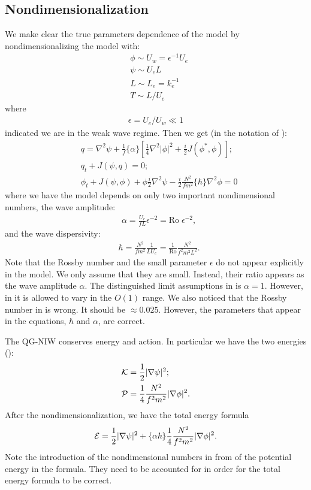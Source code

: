 \subsection{Nondimensionalization}
We make clear the true parameters dependence of the model by nondimensionalizing the model with:
\begin{align}
    &\phi \sim U_w = \epsilon^{-1} U_e\\
    &\psi \sim U_e L\\
    &L \sim L_e = k_e^{-1}\\
    &T \sim L/U_e
\end{align}
where
\begin{align}
    \epsilon = {U_e}/{U_w}\ll 1
\end{align}
indicated we are in the weak wave regime. Then we get (in the notation of \cite{Vallis_96a}):
\begin{align}
    &q = \nabla^2\psi + \frac{1}{f}\{\alpha\}\left[\frac{1}{4}\nabla^2|\phi|^2+\frac{i}{2}J(\phi^*,\phi)\right];\\
    &q_t + J(\psi,q) = 0;\\
    &\phi_t+J(\psi,\phi)+\phi\frac{i}{2}\nabla^2\psi-\frac{i}{2} \frac{N^2}{f m^2} \{\hbar\}\nabla^2\phi = 0\label{eq:QGNIW_eq3}
\end{align}
where we have the model depends on only two important nondimensional numbers, the wave amplitude:
\begin{align}
    &\alpha = \frac{U_e}{fL}\epsilon^{-2} = \text{Ro}\;\epsilon^{-2},
\end{align}
and the wave dispersivity:
\begin{align}
    &\hbar = \frac{N^2}{fm^2}\frac{1}{LU_e} = \frac{1}{\text{Ro}}\frac{N^2}{f^2 m^2 L^2}.
\end{align}
Note that the Rossby number and the small parameter $\epsilon$ do not appear explicitly in the model. We only assume that they are small. Instead, their ratio appears as the wave amplitude $\alpha$. The distinguished limit assumptions in \cite{XieVanneste_15, WagnerYoung_15, WagnerYoung_16} is $\alpha = 1$. However, in \cite{RochaEtAl_18} it is allowed to vary in the $O(1)$ range. We also noticed that the Rossby number in \cite[Table 4]{RochaEtAl_18} is wrong. It should be $\approx 0.025$. However, the parameters that appear in the equations, $\hbar$ and $\alpha$, are correct.

The QG-NIW conserves energy and action. In particular we have the two energies (\cite[(3.2)]{RochaEtAl_18}):
\begin{align}
    &\mathcal{K} = \frac{1}{2}|\nabla\psi|^2;\\
    &\mathcal{P} = \frac{1}{4}\frac{N^2}{f^2m^2} |\nabla\phi|^2.
\end{align}
After the nondimensionalization, we have the total energy formula
\begin{align}
    \mathcal{E} = \frac{1}{2}|\nabla\psi|^2+\{\alpha\hbar\}\frac{1}{4}\frac{N^2}{f^2m^2} |\nabla\phi|^2.
\end{align}
Note the introduction of the nondimensional numbers in from of the potential energy in the formula. They need to be accounted for in order for the total energy formula to be correct. 

